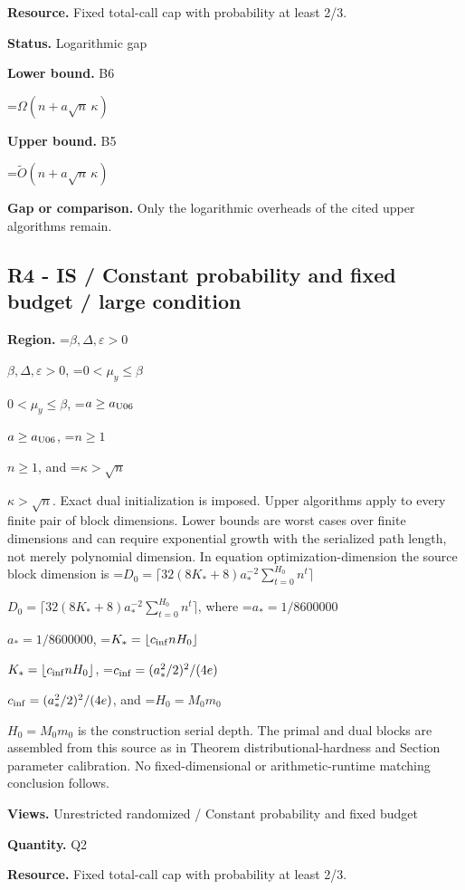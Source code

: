 \documentclass[10pt,a4paper]{article}
\newcommand{\AtlasMath}[1]{\par\begingroup\centering\setbox0=\hbox{$\displaystyle #1$}\ifdim\wd0>1.4\linewidth\typeout{ATLAS WIDE FORMULA: \the\wd0}\fi\ifdim\wd0>\linewidth\resizebox{\linewidth}{!}{\box0}\else\box0\fi\par\endgroup}
\newcommand{\AtlasInlineMath}[1]{\begingroup\setbox0=\hbox{$#1$}\ifdim\wd0>.4\linewidth\endgroup\AtlasMath{#1}\else\endgroup$#1$\fi}
\begin{document}
\textbf{Resource.} Fixed total-call cap with probability at least 2/3.



\textbf{Status.} Logarithmic gap



\textbf{Lower bound.} B6



\AtlasMath{\Omega(n+a\sqrt n\,\kappa)}


\textbf{Upper bound.} B5



\AtlasMath{\widetilde O(n+a\sqrt n\,\kappa)}


\textbf{Gap or comparison.} Only the logarithmic overheads of the cited upper algorithms remain.



\subsection{R4 - IS / Constant probability and fixed budget / large condition}


\textbf{Region.} \AtlasInlineMath{\beta,\Delta,\varepsilon>0}, \AtlasInlineMath{0<\mu_y\le\beta}, \AtlasInlineMath{a\ge a_{\rm U06}}, \AtlasInlineMath{n\ge1}, and \AtlasInlineMath{\kappa>\sqrt n}. Exact dual initialization is imposed. Upper algorithms apply to every finite pair of block dimensions. Lower bounds are worst cases over finite dimensions and can require exponential growth with the serialized path length, not merely polynomial dimension. In equation optimization-dimension the source block dimension is \AtlasInlineMath{D_0=\lceil32(8K_*+8)a_*^{-2}\sum_{t=0}^{H_0}n^t\rceil}, where \AtlasInlineMath{a_*=1/8600000}, \AtlasInlineMath{K_*=\lfloor c_{\rm inf}nH_0\rfloor}, \AtlasInlineMath{c_{\rm inf}=(a_*^2/2)^2/(4e)}, and \AtlasInlineMath{H_0=M_0m_0} is the construction serial depth. The primal and dual blocks are assembled from this source as in Theorem distributional-hardness and Section parameter calibration. No fixed-dimensional or arithmetic-runtime matching conclusion follows.



\textbf{Views.} Unrestricted randomized / Constant probability and fixed budget



\textbf{Quantity.} Q2



\textbf{Resource.} Fixed total-call cap with probability at least 2/3.
\end{document}
